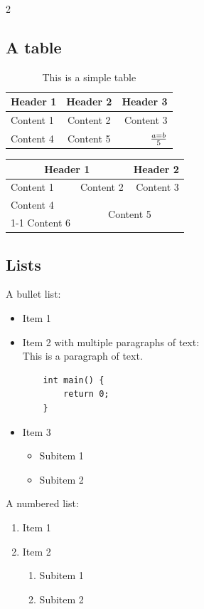 \documentclass{article}
\begin{document}
\begin{multicols}{2}
\subsection{A table}

\begin{table}[htb]
\begin{tabular}{|l|c|r|}
\hline
\textbf{Header 1} & \textbf{Header 2} & \textbf{Header 3} \\ \hline
Content 1         & Content 2         & Content 3         \\ \hline
Content 4         & Content 5         & $a=b \over 5$         \\ \hline
\end{tabular}
\caption{This is a simple table}
\end{table}

\begin{tabular}{|l|c|r|}
\hline
\multicolumn{2}{|c|}{\textbf{Header 1}} & \textbf{Header 2} \\ \hline
Content 1         & Content 2         & Content 3         \\ \hline
Content 4         & \multicolumn{2}{c|}{\multirow{2}{*}{Content 5}}         \\ \cline{1-1}
Content 6         & \multicolumn{2}{c|}{} \\ \hline
\end{tabular}

\subsection{Lists}

A bullet list:
\begin{itemize}
    \item Item 1
    \item Item 2 with multiple paragraphs of text: \\
    This is a paragraph of text. \\
    \begin{verbatim}
    int main() {
        return 0;
    }
    \end{verbatim}
    \item Item 3
    \begin{itemize}
        \item Subitem 1
        \item Subitem 2
    \end{itemize}
\end{itemize}

A numbered list:
\begin{enumerate}
    \item Item 1
    \item Item 2
    \begin{enumerate}
        \item Subitem 1
        \item Subitem 2
    \end{enumerate}
\end{enumerate}


\end{multicols}
\end{document}
